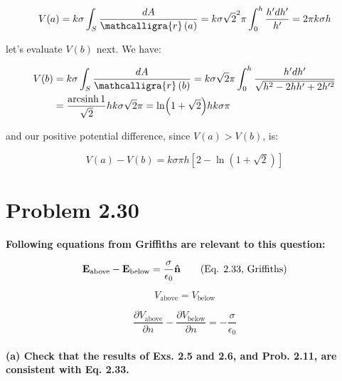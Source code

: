 \documentclass{article}
\newcommand{\scriptr}{\mathcalligra{r}\,}
\numberwithin{equation}{section}
\numberwithin{figure}{section}
\newcommand{\vbh}[1]{\vb{\hat{#1}}}
\DeclareMathOperator{\arcsinh}{arcsinh}
\begin{document}
\begin{equation}
    V(a) = k \sigma \int_S \frac{dA}{\scriptr(a)} = k \sigma \sqrt{2}^2 \pi \int_0^h \frac{h' dh'}{h'} = 2\pi k \sigma h
\end{equation}

let's evaluate $V(b)$ next. We have:

\begin{equation}
\begin{split}
    V(b) &= k \sigma \int_S \frac{dA}{\scriptr(b)} = k \sigma \sqrt{2} \pi \int_0^h \frac{h' dh'}{\sqrt{h^2 - 2hh' + 2h'^2}} \\
    &= \frac{\arcsinh 1}{\sqrt{2}} h k \sigma \sqrt{2} \pi = \ln(1+\sqrt{2}) hk \sigma \pi
\end{split}
\end{equation}

and our positive potential difference, since $V(a) > V(b)$, is:

\begin{equation}
    V(a) - V(b) = k \sigma \pi h \left[ 2 - \ln(1 + \sqrt{2}) \right]
\end{equation}

\section{Problem 2.30}

\textbf{Following equations from Griffiths are relevant to this question:}

\begin{equation*}
    \vb E_{\text{above}} - \vb E_{\text{below}} = \frac{\sigma}{\epsilon_0} \vbh n \tag{Eq. 2.33, Griffiths}
\end{equation*}

\begin{equation*}
    V_{\text{above}} = V_{\text{below}} \tag{Eq. 2.34, Griffiths}
\end{equation*}

\begin{equation*}
    \frac{\partial V_{\text{above}}}{\partial n} -  \frac{\partial V_{\text{below}}}{\partial n} = - \frac{\sigma}{\epsilon_0} \tag{Eq. 2.36, Griffiths}
\end{equation*}

\paragraph{(a) Check that the results of Exs. 2.5 and 2.6, and Prob. 2.11, are consistent with Eq. 2.33.\\}
\end{document}
